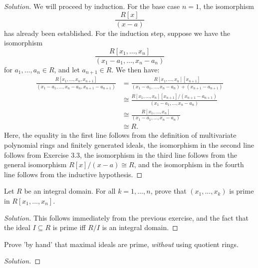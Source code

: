 \documentclass[12pt]{article}
\newenvironment{problem}[2][Problem]{\begin{trivlist}
\item[\hskip \labelsep {\bfseries #1}\hskip \labelsep {\bfseries #2.}]}{\end{trivlist}}
\newenvironment{solution}
  {\renewcommand\qedsymbol{$\blacksquare$}\begin{proof}[Solution]}
{\end{proof}}
\theoremstyle{remark}
\begin{document}
\begin{solution}
  We will proceed by induction.
  For the base case $n=1$, the isomorphism
  \begin{equation*}
    \frac{R[x]}{(x-a)}
  \end{equation*}
  has already been established.
  For the induction step, suppose we have the isomorphism
  \begin{equation*}
    \frac{R[x_1,\dots,x_n]}{(x_1-a_1,\dots,x_n-a_n)}
  \end{equation*}
  for $a_1,\dots,a_n\in R$, and let $a_{n+1}\in R$.
  We then have:
  \begin{align*}
    \frac{R[x_1,\dots,x_n,x_{n+1}]}{(x_1-a_1,\dots,x_n-a_n,x_{n+1}-a_{n+1})}
      &= \frac{R[x_1,\dots,x_n][x_{n+1}]}
      {(x_1-a_1,\dots,x_n-a_n)+(x_{n+1}-a_{n+1})}\\
      &\cong\frac{R[x_1,\dots,x_n][x_{n+1}]/(x_{n+1}-a_{n+1})}
      {(x_1-a_1,\dots,x_n-a_n)}\\
      &\cong \frac{R[x_1,\dots,x_n]}{(x_1-a_1,\dots,x_n-a_n)}\\
      &\cong R.
  \end{align*}
  \indent Here,  the equality in the first line follows from the definition
  of multivariate polynomial rings and finitely generated ideals,
  the isomorphism in the second line follows from Exercise 3.3,
  the isomorphism in the third line follows from the general isomorphism
  $R[x]/(x-a)\cong R$, and the isomorphism in the fourth line
  follows from the inductive hypothesis.
\end{solution}

\begin{problem}{4.13}
  Let $R$ be an integral domain.
  For all $k=1,\dots,n$, prove that $(x_1,\dots,x_k)$ is
  prime in $R[x_1,\dots,x_n]$.
\end{problem}
\begin{solution}
  This follows immediately from the previous exercise, and the fact that 
  the ideal $I\subseteq R$ is prime iff $R/I$ is an integral domain.
\end{solution}

\begin{problem}{4.14}
  Prove 'by hand' that maximal ideals are prime, \textit{without} using 
  quotient rings.
\end{problem}
\begin{solution}
  
\end{solution}<++>
\end{document}
